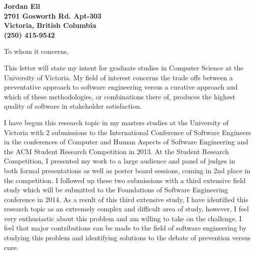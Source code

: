 \documentclass[11pt]{letter} %
\begin{document}

\begin{letter}{}


\begin{center}
\large\bf Jordan Ell \\ %
2701 Gosworth Rd. Apt-303 \\ Victoria, British Columbia\\ (250) 415-9542 %
\end{center}
\vfill

\signature{Jordan Ell} %


\opening{To whom it concerns,}

This letter will state my intent for graduate studies in Computer Science at the University of Victoria. My field of interest concerns the trade offs between a preventative approach to software engineering versus a curative approach and which of these methodologies, or combinations there of, produces the highest quality of software in stakeholder satisfaction.

I have begun this research topic in my masters studies at the University of Victoria with 2 submissions to the International Conference of Software Engineers in the conferences of Computer and Human Aspects of Software Engineering and the ACM Student Research Competition in 2013. At the Student Research Competition, I presented my work to a large audience and panel of judges in both formal presentations as well as poster board sessions, coming in 2nd place in the competition. I followed up these two submissions with a third extensive field study which will be submitted to the Foundations of Software Engineering conference in 2014. As a result of this third extensive study, I have identified this research topic as an extremely complex and difficult area of study, however, I feel very enthusiastic about this problem and am willing to take on the challenge. I feel that major contributions can be made to the field of software engineering by studying this problem and identifying solutions to the debate of prevention versus cure.


\end{letter}
\end{document}
